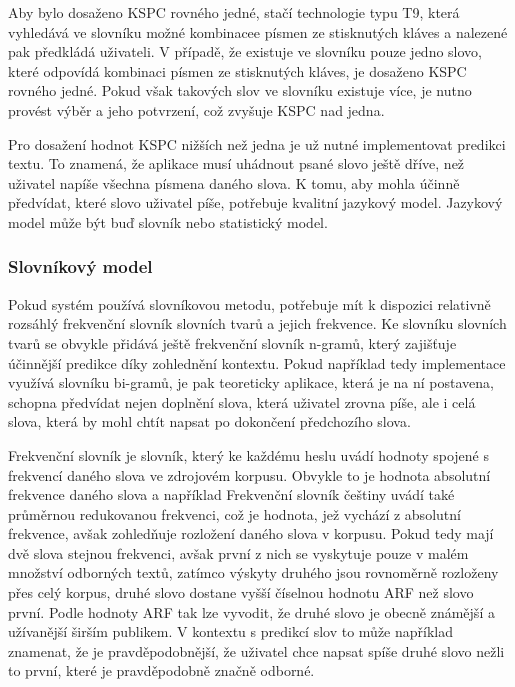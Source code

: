 \documentclass[a4paper,11pt]{article}
\begin{document}
Aby bylo dosaženo KSPC rovného jedné, stačí technologie typu T9, která vyhledává ve slovníku možné kombinacee písmen ze stisknutých kláves a nalezené pak předkládá uživateli. V případě, že existuje ve slovníku pouze jedno slovo, které odpovídá kombinaci písmen ze stisknutých kláves, je dosaženo KSPC rovného jedné. Pokud však takových slov ve slovníku existuje více, je nutno provést výběr a jeho potvrzení, což zvyšuje KSPC nad jedna.

Pro dosažení hodnot KSPC nižších než jedna je už nutné implementovat predikci textu. To znamená, že aplikace musí uhádnout psané slovo ještě dříve, než uživatel napíše všechna písmena daného slova. K tomu, aby mohla účinně předvídat, které slovo uživatel píše, potřebuje kvalitní jazykový model. Jazykový model může být buď slovník nebo statistický model. 

\subsubsection{Slovníkový model}

Pokud systém používá slovníkovou metodu, potřebuje mít k dispozici relativně rozsáhlý frekvenční slovník slovních tvarů a jejich frekvence. Ke slovníku slovních tvarů se obvykle přidává ještě frekvenční slovník n-gramů, který zajišťuje účinnější predikce díky zohlednění kontextu. Pokud například tedy implementace využívá slovníku bi-gramů, je pak teoreticky aplikace, která je na ní postavena, schopna předvídat nejen doplnění slova, která uživatel zrovna píše, ale i celá slova, která by mohl chtít napsat po dokončení předchozího slova.

Frekvenční slovník je slovník, který ke každému heslu uvádí hodnoty spojené s frekvencí daného slova ve zdrojovém korpusu. Obvykle to je hodnota absolutní frekvence daného slova a například Frekvenční slovník češtiny %
uvádí také průměrnou redukovanou frekvenci, což je hodnota, jež vychází z absolutní frekvence, avšak zohledňuje rozložení daného slova v korpusu. Pokud tedy mají dvě slova stejnou frekvenci, avšak první z nich se vyskytuje pouze v malém množství odborných textů, zatímco výskyty druhého jsou rovnoměrně rozloženy přes celý korpus, druhé slovo dostane vyšší číselnou hodnotu ARF než slovo první. Podle hodnoty ARF tak lze vyvodit, že druhé slovo je obecně známější a užívanější širším publikem. %
V kontextu s predikcí slov to může například znamenat, že je pravděpodobnější, že uživatel chce napsat spíše druhé slovo nežli to první, které je pravděpodobně značně odborné.
\end{document}
